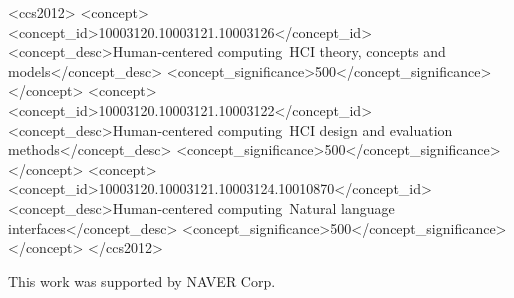 \documentclass[sigconf,screen]{config/acmart}
\begin{document}
\begin{CCSXML}
<ccs2012>
   <concept>
       <concept_id>10003120.10003121.10003126</concept_id>
       <concept_desc>Human-centered computing~HCI theory, concepts and models</concept_desc>
       <concept_significance>500</concept_significance>
       </concept>
   <concept>
       <concept_id>10003120.10003121.10003122</concept_id>
       <concept_desc>Human-centered computing~HCI design and evaluation methods</concept_desc>
       <concept_significance>500</concept_significance>
       </concept>
   <concept>
       <concept_id>10003120.10003121.10003124.10010870</concept_id>
       <concept_desc>Human-centered computing~Natural language interfaces</concept_desc>
       <concept_significance>500</concept_significance>
       </concept>
 </ccs2012>
\end{CCSXML}




\maketitle








\begin{acks}
This work was supported by NAVER Corp.
\end{acks}





\appendix


\end{document}
